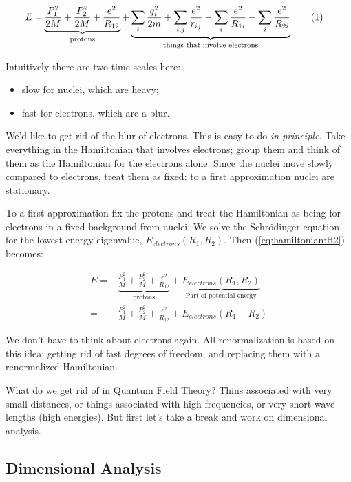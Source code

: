 \documentclass[]{article}
\newcommand\numberthis{\addtocounter{equation}{1}\tag{\theequation}}
\begin{document}
\begin{align*}
	E=& \underbrace{\frac{P_1^2}{2M} + \frac{P_2^2}{2M} + \frac{e^2}{R_{12}}}_\text{protons} + \underbrace{\sum_i \frac{q_i^2}{2m} + \sum_{i,j}\frac{e^2}{r_{ij}}- \sum_i \frac{e^2}{R_{1i}} - \sum_i \frac{e^2}{R_{2i}}}_\text{things that involve electrons} \numberthis \label{eq:hamiltonian:H2}
\end{align*}

Intuitively there are two time scales here:
\begin{itemize}
	\item slow for nuclei, which are heavy;
	\item fast for electrons, which are a blur.
\end{itemize}

We'd like to get rid of the blur of electrons. This is easy to do \emph{in principle.} Take everything in the Hamiltonian that involves electrons; group them and think of them as the Hamiltonian for the electrons alone. Since the nuclei move slowly compared to electrons, treat them as fixed: to a first approximation nuclei are stationary.

To a first approximation fix the protons and treat the Hamiltonian as being for electrons in a fixed background from nuclei. We solve the Schr\"odinger equation for the lowest energy eigenvalue, $E_{electrons}(R_1,R_2)$. Then (\ref{eq:hamiltonian:H2}) becomes:


\begin{align*}
E=& \underbrace{\frac{P_1^2}{M} + \frac{P_2^2}{M} + \frac{e^2}{R_{12}}}_\text{protons} +\underbrace{ E_{electrons}(R_1,R_2)}_\text{Part of potential energy}\\
=& \frac{P_1^2}{M} + \frac{P_2^2}{M} + \frac{e^2}{R_{12}}+ E_{electrons}(R_1-R_2)
\end{align*}

We don't have to think about electrons again. All renormalization is based on this idea: getting rid of fast degrees of freedom, and replacing them with a renormalized Hamiltonian. 

What do we get rid of in Quantum Field Theory? Thins associated with very small distances, or things associated with high frequencies, or very short wave lengths (high energies). But first let's take a break and work on dimensional analysis.

\subsection{Dimensional Analysis}
\end{document}
